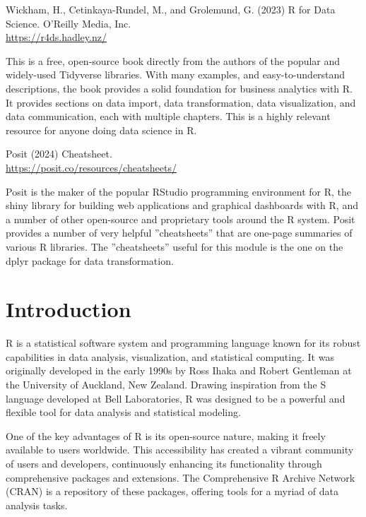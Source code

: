 \begin{resourcebox}
Wickham, H., Cetinkaya-Rundel, M., and Grolemund, G. (2023) R for Data Science. O'Reilly Media, Inc. \\

\footnotesize\url{https://r4ds.hadley.nz/}\normalsize
\end{resourcebox}

This is a free, open-source book directly from the authors of the popular and widely-used Tidyverse libraries. With many examples, and easy-to-understand descriptions, the book provides a solid foundation for business analytics with R. It provides sections on data import, data transformation, data visualization, and data communication, each with multiple chapters. This is a highly relevant resource for anyone doing data science in R.

\begin{resourcebox}
Posit (2024) Cheatsheet. \\

\footnotesize\url{https://posit.co/resources/cheatsheets/}\normalsize
\end{resourcebox}

Posit is the maker of the popular RStudio programming environment for R, the shiny library for building web applications and graphical dashboards with R, and a number of other open-source and proprietary tools around the R system. Posit provides a number of very helpful ''cheatsheets'' that are one-page summaries of various R libraries. The ''cheatsheets'' useful for this module is the one on the dplyr package for data transformation.


\section{Introduction}

R is a statistical software system and programming language known for its robust capabilities in data analysis, visualization, and statistical computing. It was originally developed in the early 1990s by Ross Ihaka and Robert Gentleman at the University of Auckland, New Zealand. Drawing inspiration from the S language developed at Bell Laboratories, R was designed to be a powerful and flexible tool for data analysis and statistical modeling.

One of the key advantages of R is its open-source nature, making it freely available to users worldwide. This accessibility has created a vibrant community of users and developers, continuously enhancing its functionality through comprehensive packages and extensions. The Comprehensive R Archive Network (CRAN) is a repository of these packages, offering tools for a myriad of data analysis tasks.

